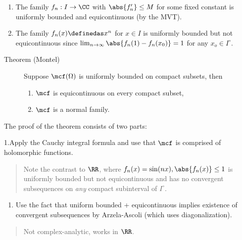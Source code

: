 \begin{enumerate}
\def\labelenumi{\arabic{enumi}.}
\tightlist
\item
  The family \(f_n: I \to \CC\) with \(\abs{f_n'} \leq M\) for some
  fixed constant is uniformly bounded and equicontinuous (by the MVT).
\item
  The family \(f_n(x) \definedas x^n\) for \(x\in I\) is uniformly
  bounded but not equicontinuous since
  \(\lim_{n\to\infty} \abs{f_n(1) - f_n(x_0)} = 1\) for any
  \(x_o \in I^\circ\).
\end{enumerate}

\begin{description}
\item[Theorem (Montel)]
Suppose \(\mcf(\Omega)\) is uniformly bounded on compact subsets, then

\begin{enumerate}
\def\labelenumi{\arabic{enumi}.}
\tightlist
\item
  \(\mcf\) is equicontinuous on every compact subset,
\item
  \(\mcf\) is a normal family.
\end{enumerate}
\end{description}

The proof of the theorem consists of two parts:

1.Apply the Cauchy integral formula and use that \(\mcf\) is comprised
of holomorphic functions.

\begin{quote}
Note the contrast to \(\RR\), where
\(f_n(x) = \sin(nx), \abs{f_n(x)} \leq 1\) is uniformly bounded but not
equicontinuous and has no convergent subsequences on \emph{any} compact
subinterval of \(I^\circ\).
\end{quote}

\begin{enumerate}
\def\labelenumi{\arabic{enumi}.}
\setcounter{enumi}{1}
\tightlist
\item
  Use the fact that uniform bounded + equicontinuous implies existence
  of convergent subsequences by Arzela-Ascoli (which uses
  diagonalization).
\end{enumerate}

\begin{quote}
Not complex-analytic, works in \(\RR\).
\end{quote}

